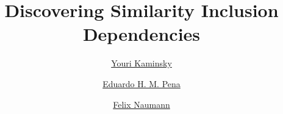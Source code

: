 \documentclass[acmsmall,natbib=false]{acmart}
\begin{document}
\title{Discovering Similarity Inclusion Dependencies}

\author{\href{https://orcid.org/0009-0007-6547-592X}{Youri Kaminsky}}

\author{\href{https://orcid.org/0000-0002-4852-3113}{Eduardo H. M. Pena}}

\author{\href{https://orcid.org/0000-0002-4483-1389}{Felix Naumann}}

\newcommand{\simIND}[1]{\;\substack{\subset\vspace{-2pt}\\\sim}_{{#1}}\;}
\newcommand{\sawfish}{\textsc{Sawfish}\xspace}
\newcommand{\algorithmName}[1]{\textsc{#1}}
\newcommand{\data}[1]{\texttt{#1}}
\newcommand{\code}[1]{{\small\texttt{#1}}}
\newcommand{\insq}[1]{$[${#1}$]$}
\newcommand{\mgets}{$\gets$}
\newcommand{\el}{$\in$}

\newcommand{\penarw}[1]{\todo[inline,color=teal!20]{Rewrite: #1}}
\newcommand{\penasugg}[1]{{\color{teal}#1}}
\newcommand{\revision}[1]{\textcolor{blue}{#1}}
\end{document}
